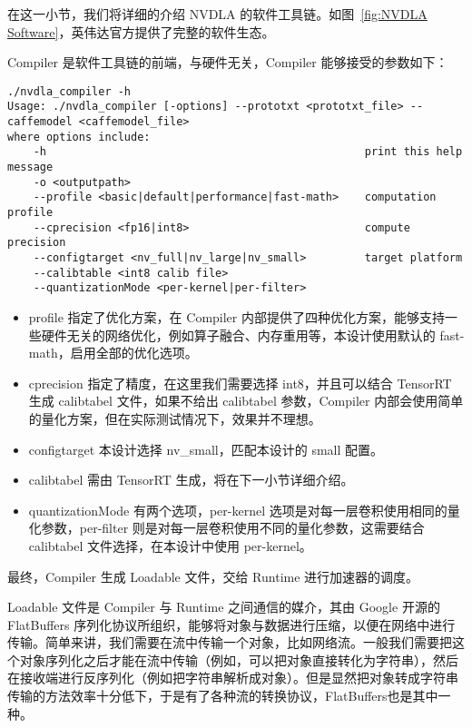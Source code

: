 在这一小节，我们将详细的介绍 NVDLA 的软件工具链。如图~\ref{fig:NVDLA Software}，英伟达官方提供了完整的软件生态。

Compiler 是软件工具链的前端，与硬件无关，Compiler 能够接受的参数如下：

\begin{lstlisting}
./nvdla_compiler -h
Usage: ./nvdla_compiler [-options] --prototxt <prototxt_file> --caffemodel <caffemodel_file>
where options include:
    -h                                                 print this help message
    -o <outputpath>                                    
    --profile <basic|default|performance|fast-math>    computation profile
    --cprecision <fp16|int8>                           compute precision
    --configtarget <nv_full|nv_large|nv_small>         target platform
    --calibtable <int8 calib file>                     
    --quantizationMode <per-kernel|per-filter>         
\end{lstlisting}

\begin{itemize}
    \item profile 指定了优化方案，在 Compiler 内部提供了四种优化方案，能够支持一些硬件无关的网络优化，例如算子融合、内存重用等，本设计使用默认的 fast-math，启用全部的优化选项。
    \item cprecision 指定了精度，在这里我们需要选择 int8，并且可以结合 TensorRT 生成 calibtabel 文件，如果不给出 calibtabel 参数，Compiler 内部会使用简单的量化方案，但在实际测试情况下，效果并不理想。
    \item configtarget 本设计选择 nv\_small，匹配本设计的 small 配置。
    \item calibtabel 需由 TensorRT 生成，将在下一小节详细介绍。
    \item quantizationMode 有两个选项，per-kernel 选项是对每一层卷积使用相同的量化参数，per-filter 则是对每一层卷积使用不同的量化参数，这需要结合 calibtabel 文件选择，在本设计中使用 per-kernel。
\end{itemize}

最终，Compiler 生成 Loadable 文件，交给 Runtime 进行加速器的调度。

Loadable 文件是 Compiler 与 Runtime 之间通信的媒介，其由 Google 开源的 FlatBuffers 序列化协议所组织，能够将对象与数据进行压缩，以便在网络中进行传输。简单来讲，我们需要在流中传输一个对象，比如网络流。一般我们需要把这个对象序列化之后才能在流中传输（例如，可以把对象直接转化为字符串），然后在接收端进行反序列化（例如把字符串解析成对象）。但是显然把对象转成字符串传输的方法效率十分低下，于是有了各种流的转换协议，FlatBuffers也是其中一种。

